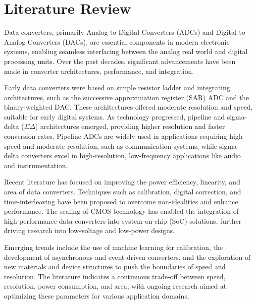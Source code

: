 \chapter{Literature Review}
Data converters, primarily Analog-to-Digital Converters (ADCs) and Digital-to-Analog Converters (DACs), are essential components in modern electronic systems, enabling seamless interfacing between the analog real world and digital processing units. Over the past decades, significant advancements have been made in converter architectures, performance, and integration.

Early data converters were based on simple resistor ladder and integrating architectures, such as the successive approximation register (SAR) ADC and the binary-weighted DAC. These architectures offered moderate resolution and speed, suitable for early digital systems. As technology progressed, pipeline and sigma-delta (\(\Sigma\Delta\)) architectures emerged, providing higher resolution and faster conversion rates. Pipeline ADCs are widely used in applications requiring high speed and moderate resolution, such as communication systems, while sigma-delta converters excel in high-resolution, low-frequency applications like audio and instrumentation.

Recent literature has focused on improving the power efficiency, linearity, and area of data converters. Techniques such as calibration, digital correction, and time-interleaving have been proposed to overcome non-idealities and enhance performance. The scaling of CMOS technology has enabled the integration of high-performance data converters into system-on-chip (SoC) solutions, further driving research into low-voltage and low-power designs.

Emerging trends include the use of machine learning for calibration, the development of asynchronous and event-driven converters, and the exploration of new materials and device structures to push the boundaries of speed and resolution. The literature indicates a continuous trade-off between speed, resolution, power consumption, and area, with ongoing research aimed at optimizing these parameters for various application domains.